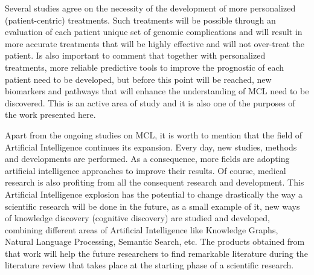 Several studies\cite{Inamdar2016}\cite{Steiner2018}\cite{Schieber2018}\cite{Dreyling2016} agree on the necessity of the development of more personalized (patient-centric) treatments. Such treatments will be possible through an evaluation of each patient unique set of genomic complications and will result in more accurate treatments that will be highly effective and will not over-treat the patient. Is also important to comment that together with personalized treatments, more reliable predictive tools to improve the prognostic of each patient need to be developed, but before this point will be reached, new biomarkers and pathways that will enhance the understanding of MCL need to be discovered. This is an active area of study and it is also one of the purposes of the work presented here.

Apart from the ongoing studies on MCL, it is worth to mention that the field of Artificial Intelligence continues its expansion. Every day, new studies, methods and developments are performed. As a consequence, more fields are adopting artificial intelligence approaches to improve their results. Of course, medical research is also profiting from all the consequent research and development.
This Artificial Intelligence explosion has the potential to change drastically the way a scientific research will be done in the future, as a small example of it, new ways of knowledge discovery (cognitive discovery) are studied and developed, combining different areas of Artificial Intelligence like Knowledge Graphs, Natural Language Processing, Semantic Search, etc. The products obtained from that work will help the future researchers to find remarkable literature during the literature review that takes place at the starting phase of a scientific research.\cite{Raymond2019}